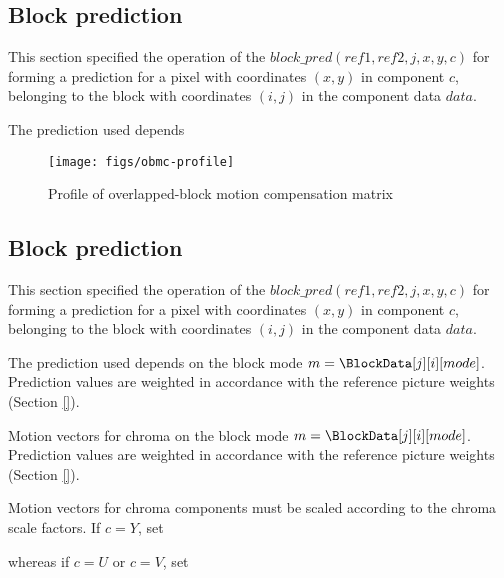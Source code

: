 \subsection{Block prediction}

\label{mcblock}

This section specified the operation of the $block\_pred(ref1, ref2, j, x, y, c)$ 
for forming a prediction for a pixel 
with coordinates $(x,y)$ in component $c$, belonging to the block with coordinates $(i,j)$ in the component
data $data$.

The prediction used depends 
\begin{figure}[h]
\centering
\texttt{[image: figs/obmc-profile]}
\caption{Profile of overlapped-block motion compensation matrix}
\label{fig:weightprofile}
\end{figure}

\subsection{Block prediction}

\label{mcblock}

This section specified the operation of the $block\_pred(ref1, ref2, j, x, y, c)$ 
for forming a prediction for a pixel 
with coordinates $(x,y)$ in component $c$, belonging to the block with coordinates $(i,j)$ in the component
data $data$.

The prediction used depends on the block mode $m=\BlockData[j][i][mode]$. Prediction values are weighted
in accordance with the reference picture weights (Section \ref{}). 

Motion vectors for chroma on the block mode $m=\BlockData[j][i][mode]$. Prediction values are weighted
in accordance with the reference picture weights (Section \ref{}). 

Motion vectors for chroma components must be scaled according to the chroma scale factors. If $c=Y$, set

\begin{pseudo*}
\end{pseudo*}

whereas if $c=U$ or $c=V$, set

\begin{pseudo*}
\end{pseudo*}

